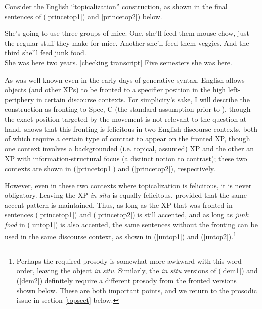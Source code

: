 Consider the English ``topicalization'' construction, as shown in the final sentences of (\ref{princetop1}) and \ref{princetop2}) below.

\begin{exe}
\ex \label{princetop1} She's going to use three groups of mice.
One, she'll feed them mouse chow, just the regular stuff they make for
mice.
Another she'll feed them veggies.
And the third she'll feed junk food.\\

\ex \label{princetop2} She was here two years.
[checking transcript] Five semesters she was here.\\
\citep[][8,9]{prince1999} 

\end{exe}

\noindent As was well-known even in the early days of generative syntax, English allows objects (and other XPs) to be fronted to a specifier position in the high left-periphery in certain discourse contexts.
For simplicity's sake, I will describe the construction as fronting to Spec, C (the standard assumption prior to \citealt{rizzi1997}), though the exact position targeted by the movement is not relevant to the question at hand.
\citet{prince1985,prince1998, prince1999} shows that this fronting is felicitous in two English discourse contexts, both of which require a certain type of contrast to appear on the fronted XP, though one context involves a backgrounded (i.e. topical, assumed) XP and the other an XP with information-structural focus (a distinct notion to contrast); these two contexts are shown in (\ref{princetop1}) and (\ref{princetop2}), respectively.

However, even in these two contexts where topicalization is felicitous, it is never obligatory.
Leaving the XP \textsl{in situ} is equally felicitous, provided that the same accent pattern is maintained.
Thus, as long as the XP that was fronted in sentences (\ref{princetop1}) and (\ref{princetop2}) is still accented, and as long as \textsl{junk food} in (\ref{untop1}) is also accented, the same sentences without the fronting can be used in the same discourse context, as shown in (\ref{untop1}) and (\ref{untop2}).\footnote{Perhaps the required prosody is somewhat more awkward with this word order, leaving the object \textsl{in situ}.
Similarly, the \textsl{in situ} versions of (\ref{dem1}) and (\ref{dem2}) definitely require a different prosody from the fronted versions shown below.
These are both important points, and we return to the prosodic issue in section \ref{topsect} below.} 

